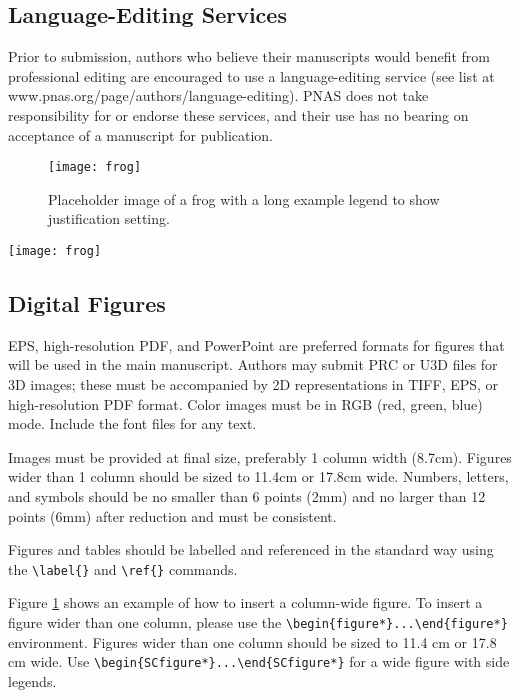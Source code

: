 \documentclass[9pt,twocolumn,twoside,lineno]{pnas-new}
\begin{document}
\subsection*{Language-Editing Services}
Prior to submission, authors who believe their manuscripts would benefit from professional editing are encouraged to use a language-editing service (see list at www.pnas.org/page/authors/language-editing). PNAS does not take responsibility for or endorse these services, and their use has no bearing on acceptance of a manuscript for publication.

\begin{figure}%
\centering
\texttt{[image: frog]}
\caption{Placeholder image of a frog with a long example legend to show justification setting.}
\label{fig:frog}
\end{figure}


\begin{SCfigure*}[\sidecaptionrelwidth][t]
\centering
\texttt{[image: frog]}
\caption{This legend would be placed at the side of the figure, rather than below it.}\label{fig:side}
\end{SCfigure*}

\subsection*{Digital Figures}

EPS, high-resolution PDF, and PowerPoint are preferred formats for figures that will be used in the main manuscript. Authors may submit PRC or U3D files for 3D images; these must be accompanied by 2D representations in TIFF, EPS, or high-resolution PDF format. Color images must be in RGB (red, green, blue) mode. Include the font files for any text.

Images must be provided at final size, preferably 1 column width (8.7cm). Figures wider than 1 column should be sized to 11.4cm or 17.8cm wide. Numbers, letters, and symbols should be no smaller than 6 points (2mm) and no larger than 12 points (6mm) after reduction and must be consistent.

Figures and tables should be labelled and referenced in the standard way using the \verb|\label{}| and \verb|\ref{}| commands.

Figure \ref{fig:frog} shows an example of how to insert a column-wide figure. To insert a figure wider than one column, please use the \verb|\begin{figure*}...\end{figure*}| environment. Figures wider than one column should be sized to 11.4 cm or 17.8 cm wide. Use \verb|\begin{SCfigure*}...\end{SCfigure*}| for a wide figure with side legends.
\end{document}
